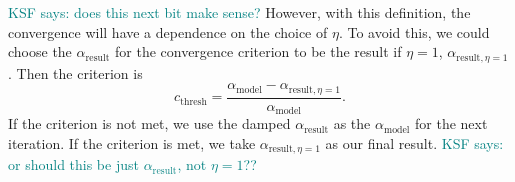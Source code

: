 \documentclass[modern]{aastex62}
\newcommand{\KSF}[1]{\textcolor{teal}{KSF says: #1}}
\begin{document}
\KSF{does this next bit make sense?}
However, with this definition, the convergence will have a dependence on the choice of $\eta$.
To avoid this, we could choose the $\alpha_\mathrm{result}$ for the convergence criterion to be the result if $\eta=1$, $\alpha_{\mathrm{result},\eta=1}$.
Then the criterion is
\begin{equation}
    c_\mathrm{thresh} = \frac{\alpha_\mathrm{model} - \alpha_{\mathrm{result},\eta=1}}{\alpha_\mathrm{model}}.
\end{equation}
If the criterion is not met, we use the damped $\alpha_\mathrm{result}$ as the $\alpha_\mathrm{model}$ for the next iteration.
If the criterion is met, we take $\alpha_{\mathrm{result},\eta=1}$ as our final result. 
\KSF{or should this be just $\alpha_\mathrm{result}$, not $\eta=1$??}

% 
%

\end{document}

